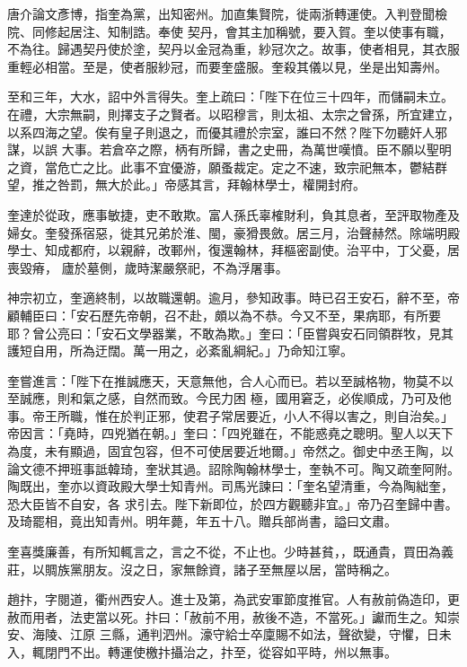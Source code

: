 \begin{pinyinscope}
 唐介論文彥博，指奎為黨，出知密州。加直集賢院，徙兩浙轉運使。入判登聞檢院、同修起居注、知制誥。奉使
 契丹，會其主加稱號，要入賀。奎以使事有職，不為往。歸遇契丹使於塗，契丹以金冠為重，紗冠次之。故事，使者相見，其衣服重輕必相當。至是，使者服紗冠，而要奎盛服。奎殺其儀以見，坐是出知壽州。



 至和三年，大水，詔中外言得失。奎上疏曰：「陛下在位三十四年，而儲嗣未立。在禮，大宗無嗣，則擇支子之賢者。以昭穆言，則太祖、太宗之曾孫，所宜建立，以系四海之望。俟有皇子則退之，而優其禮於宗室，誰曰不然？陛下勿聽奸人邪謀，以誤
 大事。若倉卒之際，柄有所歸，書之史冊，為萬世嘆憤。臣不願以聖明之資，當危亡之比。此事不宜優游，願蚤裁定。定之不速，致宗祀無本，鬱結群望，推之咎罰，無大於此。」帝感其言，拜翰林學士，權開封府。



 奎達於從政，應事敏捷，吏不敢欺。富人孫氏辜榷財利，負其息者，至評取物產及婦女。奎發孫宿惡，徙其兄弟於淮、閩，豪猾畏斂。居三月，治聲赫然。除端明殿學士、知成都府，以親辭，改鄆州，復還翰林，拜樞密副使。治平中，丁父憂，居喪毀瘠，
 廬於墓側，歲時潔嚴祭祀，不為浮屠事。



 神宗初立，奎適終制，以故職還朝。逾月，參知政事。時已召王安石，辭不至，帝顧輔臣曰：「安石歷先帝朝，召不赴，頗以為不恭。今又不至，果病耶，有所要耶？曾公亮曰：「安石文學器業，不敢為欺。」奎曰：「臣嘗與安石同領群牧，見其護短自用，所為迂闊。萬一用之，必紊亂綱紀。」乃命知江寧。



 奎嘗進言：「陛下在推誠應天，天意無他，合人心而已。若以至誠格物，物莫不以至誠應，則和氣之感，自然而致。今民力困
 極，國用窘乏，必俟順成，乃可及他事。帝王所職，惟在於判正邪，使君子常居要近，小人不得以害之，則自治矣。」帝因言：「堯時，四兇猶在朝。」奎曰：「四兇雖在，不能惑堯之聰明。聖人以天下為度，未有顯過，固宜包容，但不可使居要近地爾。」帝然之。御史中丞王陶，以論文德不押班事詆韓琦，奎狀其過。詔除陶翰林學士，奎執不可。陶又疏奎阿附。陶既出，奎亦以資政殿大學士知青州。司馬光諫曰：「奎名望清重，今為陶絀奎，恐大臣皆不自安，各
 求引去。陛下新即位，於四方觀聽非宜。」帝乃召奎歸中書。及琦罷相，竟出知青州。明年薨，年五十八。贈兵部尚書，謚曰文肅。



 奎喜獎廉善，有所知輒言之，言之不從，不止也。少時甚貧，，既通貴，買田為義莊，以賙族黨朋友。沒之日，家無餘資，諸子至無屋以居，當時稱之。



 趙抃，字閱道，衢州西安人。進士及第，為武安軍節度推官。人有赦前偽造印，更赦而用者，法吏當以死。抃曰：「赦前不用，赦後不造，不當死。」讞而生之。知崇安、海陵、江原
 三縣，通判泗州。濠守給士卒廩賜不如法，聲欲變，守懼，日未入，輒閉門不出。轉運使檄抃攝治之，抃至，從容如平時，州以無事。




\end{pinyinscope}
